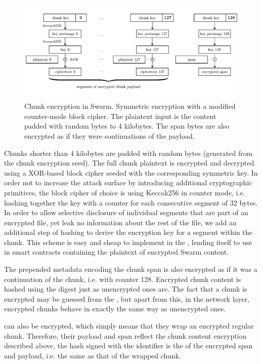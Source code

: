 \begin{figure}[htbp]
    \centering
    \includegraphics[width=\textwidth]{fig/chunk-encryption.pdf}
    \caption[Chunk encryption in Swarm \statusgreen]{Chunk encryption in Swarm. Symmetric encryption with a modified counter-mode block cipher. The plaintext input is the content padded with random bytes to 4 kilobytes. The span bytes are also encrypted as if they were continuations of the payload.}
    \label{fig:chunk-encryption}
\end{figure}


Chunks shorter than 4 kilobytes are padded with random bytes (generated from the chunk encryption seed). The full chunk plaintext is encrypted and decrypted using a XOR-based block cipher seeded with the corresponding symmetric key. In order not to increase the attack surface by introducing additional cryptographic primitives, the block cipher of choice is using Keccak256 in counter mode, i.e. hashing together the key with a counter for each consecutive segment of 32 bytes. In order to allow selective disclosure of individual segments that are part of an encrypted file, yet leak no information about the rest of the file, we add an additional step of hashing to derive the encryption key for a segment within the chunk. This scheme is easy and cheap to implement in the , lending itself to use in smart contracts containing the plaintext of encrypted Swarm content. 

The prepended metadata encoding the chunk span is also encrypted as if it was a continuation of the chunk, i.e. with counter 128. Encrypted chunk content is hashed using the  digest just as unencrypted ones are. The fact that a chunk is encrypted may be guessed from the , but apart from this, in the network layer, encrypted chunks behave in exactly the same way as unencrypted ones.

 can also be encrypted, which simply means that they wrap an encrypted regular chunk. Therefore, their payload and span reflect the chunk content encryption described above, the hash signed with the identifier is the  of the encrypted span and payload, i.e. the same as that of the wrapped chunk.

